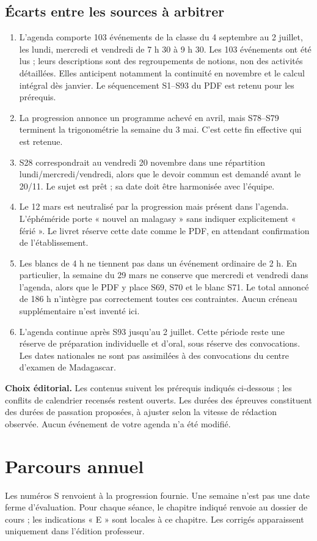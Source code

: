 \section{Écarts entre les sources à arbitrer}
\begin{enumerate}
\item L'agenda comporte 103 événements de la classe du 4 septembre au 2 juillet, les lundi, mercredi et vendredi de 7 h 30 à 9 h 30. Les 103 événements ont été lus ; leurs descriptions sont des regroupements de notions, non des activités détaillées. Elles anticipent notamment la continuité en novembre et le calcul intégral dès janvier. Le séquencement S1--S93 du PDF est retenu pour les prérequis.
\item La progression annonce un programme achevé en avril, mais S78--S79 terminent la trigonométrie la semaine du 3 mai. C'est cette fin effective qui est retenue.
\item S28 correspondrait au vendredi 20 novembre dans une répartition lundi/mercredi/vendredi, alors que le devoir commun est demandé avant le 20/11. Le sujet est prêt ; sa date doit être harmonisée avec l'équipe.
\item Le 12 mars est neutralisé par la progression mais présent dans l'agenda. L'éphéméride porte « nouvel an malagasy » sans indiquer explicitement « férié ». Le livret réserve cette date comme le PDF, en attendant confirmation de l'établissement.
\item Les blancs de 4 h ne tiennent pas dans un événement ordinaire de 2 h. En particulier, la semaine du 29 mars ne conserve que mercredi et vendredi dans l'agenda, alors que le PDF y place S69, S70 et le blanc S71. Le total annoncé de 186 h n'intègre pas correctement toutes ces contraintes. Aucun créneau supplémentaire n'est inventé ici.
\item L'agenda continue après S93 jusqu'au 2 juillet. Cette période reste une réserve de préparation individuelle et d'oral, sous réserve des convocations. Les dates nationales ne sont pas assimilées à des convocations du centre d'examen de Madagascar.
\end{enumerate}
\textbf{Choix éditorial.} Les contenus suivent les prérequis indiqués ci-dessous ; les conflits de calendrier recensés restent ouverts. Les durées des épreuves constituent des durées de passation proposées, à ajuster selon la vitesse de rédaction observée. Aucun événement de votre agenda n'a été modifié.
\fi
\tableofcontents
\clearpage
\chapter*{Parcours annuel}
Les numéros S renvoient à la progression fournie. Une semaine n'est pas une date ferme d'évaluation. Pour chaque séance, le chapitre indiqué renvoie au dossier de cours ; les indications « E » sont locales à ce chapitre. Les corrigés apparaissent uniquement dans l'édition professeur.


